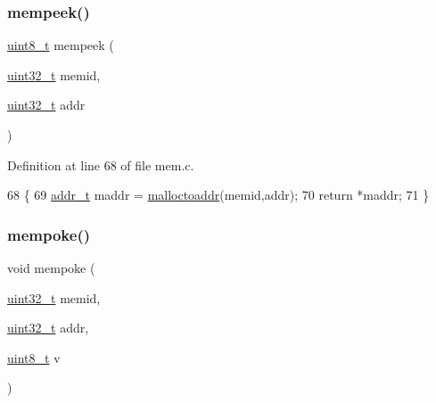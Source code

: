 \subsubsection{\texorpdfstring{mempeek()}{mempeek()}}
{\footnotesize\ttfamily \hyperlink{a00095_aba7bc1797add20fe3efdf37ced1182c5_aba7bc1797add20fe3efdf37ced1182c5}{uint8\+\_\+t} mempeek (\begin{DoxyParamCaption}\item[{\hyperlink{a00095_a435d1572bf3f880d55459d9805097f62_a435d1572bf3f880d55459d9805097f62}{uint32\+\_\+t}}]{memid,  }\item[{\hyperlink{a00095_a435d1572bf3f880d55459d9805097f62_a435d1572bf3f880d55459d9805097f62}{uint32\+\_\+t}}]{addr }\end{DoxyParamCaption})}



Definition at line 68 of file mem.\+c.


\begin{DoxyCode}
68                                                \{
69     \hyperlink{a00095_a295f71165288684c38c6bb836fbb3c59_a295f71165288684c38c6bb836fbb3c59}{addr\_t} maddr = \hyperlink{a00107_ae024364045572d15f9b90b8a046d6807_ae024364045572d15f9b90b8a046d6807}{malloctoaddr}(memid,addr);
70     \textcolor{keywordflow}{return} *maddr;
71 \}
\end{DoxyCode}
\mbox{\label{a00110_a2de854ee97d4e6d27f7aa7899a2d1d32_a2de854ee97d4e6d27f7aa7899a2d1d32}} 
\subsubsection{\texorpdfstring{mempoke()}{mempoke()}}
{\footnotesize\ttfamily void mempoke (\begin{DoxyParamCaption}\item[{\hyperlink{a00095_a435d1572bf3f880d55459d9805097f62_a435d1572bf3f880d55459d9805097f62}{uint32\+\_\+t}}]{memid,  }\item[{\hyperlink{a00095_a435d1572bf3f880d55459d9805097f62_a435d1572bf3f880d55459d9805097f62}{uint32\+\_\+t}}]{addr,  }\item[{\hyperlink{a00095_aba7bc1797add20fe3efdf37ced1182c5_aba7bc1797add20fe3efdf37ced1182c5}{uint8\+\_\+t}}]{v }\end{DoxyParamCaption})}




